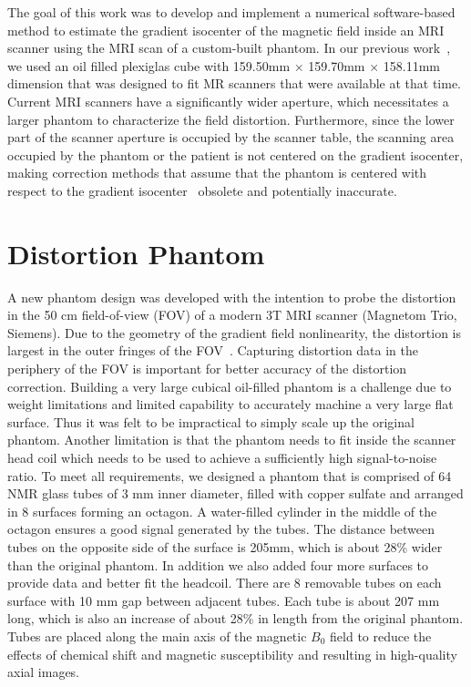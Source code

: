The goal of this work was to develop and implement a numerical software-based method to estimate the gradient isocenter of the magnetic field inside an MRI scanner using the MRI scan of a custom-built phantom.  In our previous work~\cite{LSS06a,LSS06b,LSS08a,tlee_iaeng}, we used an oil filled plexiglas cube with
159.50mm $\times$ 159.70mm $\times$ 158.11mm dimension that was designed to fit MR scanners that were available at that time.  Current MRI scanners have a significantly wider aperture, which necessitates a larger phantom to characterize the field distortion.  Furthermore, since the lower part of the scanner aperture is occupied by the scanner table, the scanning area occupied by the phantom or the patient is not centered on the gradient isocenter, making correction methods that assume that the phantom is centered with respect to the gradient isocenter~\cite{LSS06a,LSS06b,LSS08a,tlee_iaeng,simple_approach} obsolete and potentially inaccurate.

\section{Distortion Phantom}
A new phantom design was developed with the intention to probe the distortion in the 50 cm field-of-view (FOV) of a modern 3T MRI scanner (Magnetom Trio, Siemens).  Due to the geometry of the gradient field nonlinearity, the distortion is largest in the outer fringes of the FOV~\cite{LSS06a,LSS06b,LSS08a,tlee_iaeng}. Capturing distortion data in the periphery of the FOV is important for better accuracy of the distortion correction. Building a very large cubical oil-filled phantom is a challenge due to weight limitations and limited capability to accurately machine a very large flat surface. Thus it was felt to be impractical to simply scale up the original phantom.  Another limitation is that the phantom needs to fit inside the scanner head coil which needs to be used to achieve a sufficiently high signal-to-noise ratio.  To meet all requirements, we designed a phantom that is comprised of 64 NMR glass tubes of 3 mm inner diameter, filled with copper sulfate and arranged in 8 surfaces forming an octagon.  A water-filled cylinder in the middle of the octagon ensures a good signal generated by the tubes.  The distance between tubes on the opposite side of the surface is 205mm, which is about 28\% wider than the original phantom. In addition we also added four more surfaces to provide data and better fit the headcoil.  There are 8 removable tubes on each surface with 10 mm gap between adjacent tubes.  Each tube is about 207 mm long, which is also an increase of about 28\% in length from the original phantom.  Tubes are placed along the main axis of the magnetic $B_0$  field to reduce the effects of chemical shift and magnetic susceptibility and
resulting in high-quality axial images.

